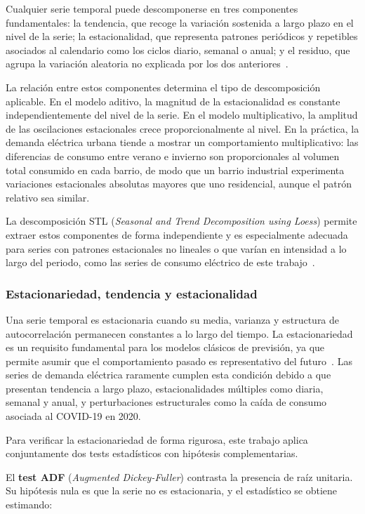 \documentclass[12pt, a4paper]{article}
\begin{document}
Cualquier serie temporal puede descomponerse en tres componentes fundamentales: la tendencia, que recoge la variación sostenida a largo plazo en el nivel de la serie; la estacionalidad, que representa patrones periódicos y repetibles asociados al calendario como los ciclos diario, semanal o anual; y el residuo, que agrupa la variación aleatoria no explicada por los dos anteriores~\cite{hyndman2021}.

La relación entre estos componentes determina el tipo de descomposición aplicable. En el modelo aditivo, la magnitud de la estacionalidad es constante independientemente del nivel de la serie. En el modelo multiplicativo, la amplitud de las oscilaciones estacionales crece proporcionalmente al nivel. En la práctica, la demanda eléctrica urbana tiende a mostrar un comportamiento multiplicativo: las diferencias de consumo entre verano e invierno son proporcionales al volumen total consumido en cada barrio, de modo que un barrio industrial experimenta variaciones estacionales absolutas mayores que uno residencial, aunque el patrón relativo sea similar.

La descomposición STL (\textit{Seasonal and Trend Decomposition using Loess}) permite extraer estos componentes de forma independiente y es especialmente adecuada para series con patrones estacionales no lineales o que varían en intensidad a lo largo del periodo, como las series de consumo eléctrico de este trabajo~\cite{hyndman2021}.

\subsubsection{Estacionariedad, tendencia y estacionalidad}


Una serie temporal es estacionaria cuando su media, varianza y estructura de autocorrelación permanecen constantes a lo largo del tiempo. La estacionariedad es un requisito fundamental para los modelos clásicos de previsión, ya que permite asumir que el comportamiento pasado es representativo del futuro~\cite{hyndman2021}. Las series de demanda eléctrica raramente cumplen esta condición debido a que presentan tendencia a largo plazo, estacionalidades múltiples como diaria, semanal y anual, y perturbaciones estructurales como la caída de consumo asociada al COVID-19 en 2020.

Para verificar la estacionariedad de forma rigurosa, este trabajo aplica conjuntamente dos tests estadísticos con hipótesis complementarias.

El \textbf{test ADF} (\textit{Augmented Dickey-Fuller}) contrasta la presencia de raíz unitaria. Su hipótesis nula es que la serie no es estacionaria, y el estadístico se obtiene estimando:
\end{document}
